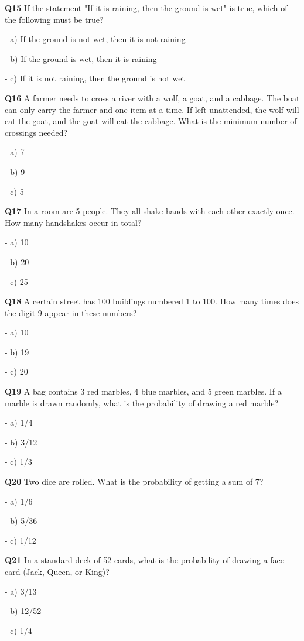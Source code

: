 \textbf{Q15} If the statement "If it is raining, then the ground is wet" is true, which of the following must be true?\par
\quad - a) If the ground is not wet, then it is not raining\par
\quad - b) If the ground is wet, then it is raining\par
\quad - c) If it is not raining, then the ground is not wet\par

\textbf{Q16} A farmer needs to cross a river with a wolf, a goat, and a cabbage. The boat can only carry the farmer and one item at a time. If left unattended, the wolf will eat the goat, and the goat will eat the cabbage. What is the minimum number of crossings needed?\par
\quad - a) 7\par
\quad - b) 9\par
\quad - c) 5\par

\textbf{Q17} In a room are 5 people. They all shake hands with each other exactly once. How many handshakes occur in total?\par
\quad - a) 10\par
\quad - b) 20\par
\quad - c) 25\par

\textbf{Q18} A certain street has 100 buildings numbered 1 to 100. How many times does the digit 9 appear in these numbers?\par
\quad - a) 10\par
\quad - b) 19\par
\quad - c) 20\par

\textbf{Q19} A bag contains 3 red marbles, 4 blue marbles, and 5 green marbles. If a marble is drawn randomly, what is the probability of drawing a red marble?\par
\quad - a) 1/4\par
\quad - b) 3/12\par
\quad - c) 1/3\par

\textbf{Q20} Two dice are rolled. What is the probability of getting a sum of 7?\par
\quad - a) 1/6\par
\quad - b) 5/36\par
\quad - c) 1/12\par

\textbf{Q21} In a standard deck of 52 cards, what is the probability of drawing a face card (Jack, Queen, or King)?\par
\quad - a) 3/13\par
\quad - b) 12/52\par
\quad - c) 1/4\par

